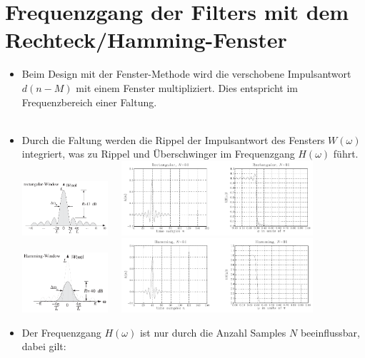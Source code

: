 	\section{Frequenzgang der Filters mit dem Rechteck/Hamming-Fenster}
		\begin{itemize}
		 \item Beim Design mit der Fenster-Methode wird die verschobene Impulsantwort $d(n-M)$ mit einem Fenster multipliziert. Dies entspricht im Frequenzbereich einer Faltung.\\[0.2cm]
		 \\
		 \item Durch die Faltung werden die Rippel der Impulsantwort des Fensters $W(\omega)$ integriert, was zu Rippel und Überschwinger im Frequenzgang $H(\omega)$ führt.\\[0.1cm]
		 \includegraphics[width = 0.25\textwidth]{pic/spektrumRechteckFenster.pdf}$\quad$
		 \includegraphics[width = 0.56\textwidth]{pic/spektrumRechteckFenster2.pdf}\\[0.1cm]
		 \includegraphics[width = 0.25\textwidth]{pic/spektrumHammingFenster.pdf}$\quad$
		 \includegraphics[width = 0.56\textwidth]{pic/spektrumHammingFenster2.pdf}
		 \item Der Frequenzgang $H(\omega)$ ist nur durch die Anzahl Samples $N$ beeinflussbar, dabei gilt:\\[0.1cm]

\end{itemize}
